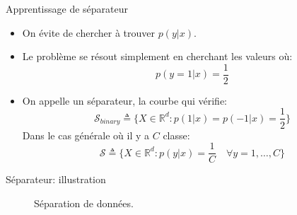 \documentclass[8pt]{beamer}
\begin{document}
		\begin{frame}{Apprentissage de séparateur}
			\begin{itemize}
				\item<1-> On évite de chercher à trouver $p(y\vert x)$.
				\item<2-> Le problème se résout simplement en cherchant les valeurs où:
						\begin{equation*}
							p(y = 1 \vert x) = \frac{1}{2}
						\end{equation*}
				\item  On appelle un séparateur, la courbe qui vérifie:
					\begin{equation}
						\mathscr{S}_{binary} \triangleq \{X \in \mathbb{R}^d: p(1\vert x) = p(-1\vert x) = \frac{1}{2} \}
					\end{equation}
					Dans le cas générale où il y a $C$ classe:
					\begin{equation}
						\mathscr{S} \triangleq \{X \in \mathbb{R}^d: p(y\vert x) = \frac{1}{C} \quad \forall y = 1, \dots, C\}
					\end{equation}
			\end{itemize}
		\end{frame}

		\begin{frame}{Séparateur: illustration}
			\begin{figure}[H]
				{
					\caption{\tiny Séparation de données.}
				}
			\end{figure}
		\end{frame}
\end{document}

